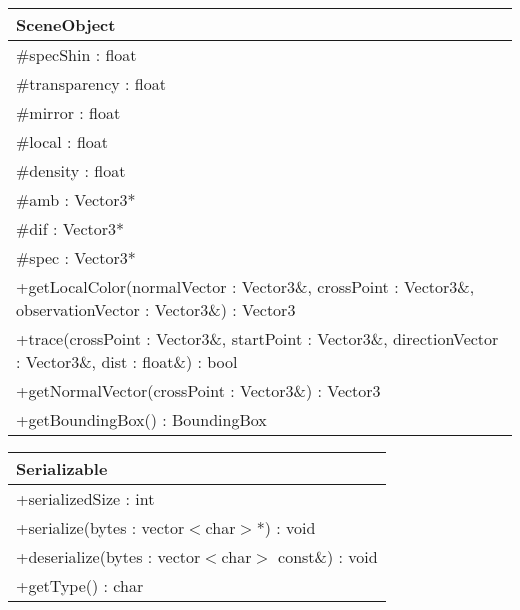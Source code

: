 \begin{center}
    \begin{tabular}{|l|}
    \hline
    SceneObject \\ \hline
    \#specShin : float \\
    \#transparency : float \\
    \#mirror : float \\
    \#local : float \\
    \#density : float \\
    \#amb : Vector3* \\
    \#dif : Vector3* \\
    \#spec : Vector3* \\
    \hline
	+getLocalColor(normalVector : Vector3\&, crossPoint : Vector3\&, observationVector : Vector3\&) : Vector3 \\
	+trace(crossPoint : Vector3\&, startPoint : Vector3\&, directionVector : Vector3\&, dist : float\&) : bool \\
	+getNormalVector(crossPoint : Vector3\&) : Vector3 \\
	+getBoundingBox() : BoundingBox \\
	\hline
    \end{tabular}
\end{center}

\begin{center}
    \begin{tabular}{|l|}
    \hline
    Serializable \\ \hline
    +serializedSize : int \\ \hline
	+serialize(bytes : vector$<$char$>$*) : void \\ 
	+deserialize(bytes : vector$<$char$>$ const\&) : void \\
	+getType() : char \\
	\hline
    \end{tabular}
\end{center}

